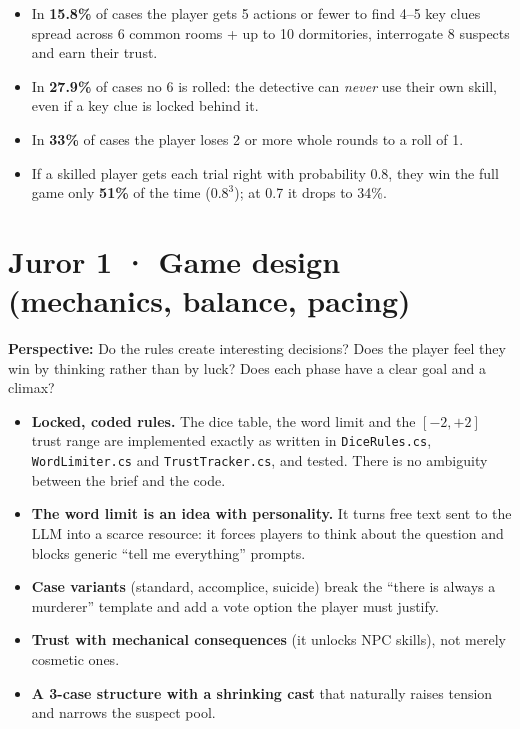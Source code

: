 \documentclass[11pt,a4paper]{article}
\newcommand{\file}[1]{\texttt{\small #1}}
\begin{document}
\begin{itemize}
\item In \textbf{15.8\%} of cases the player gets 5 actions or fewer to find 4--5 key clues spread
across 6 common rooms + up to 10 dormitories, interrogate 8 suspects and earn their trust.
\item In \textbf{27.9\%} of cases no 6 is rolled: the detective can \emph{never} use their own skill,
even if a key clue is locked behind it.
\item In \textbf{33\%} of cases the player loses 2 or more whole rounds to a roll of 1.
\item If a skilled player gets each trial right with probability 0.8, they win the full game only
\textbf{51\%} of the time ($0.8^3$); at 0.7 it drops to 34\%.
\end{itemize}

\section{Juror 1 · Game design (mechanics, balance, pacing)}

\begin{perfil}
\textbf{Perspective:} Do the rules create interesting decisions? Does the player feel they win by
thinking rather than by luck? Does each phase have a clear goal and a climax?
\end{perfil}

\begin{fuerte}
\begin{itemize}
\item \textbf{Locked, coded rules.} The dice table, the word limit and the $[-2,+2]$ trust range are
implemented exactly as written in \file{DiceRules.cs}, \file{WordLimiter.cs} and
\file{TrustTracker.cs}, and tested. There is no ambiguity between the brief and the code.
\item \textbf{The word limit is an idea with personality.} It turns free text sent to the LLM into a
scarce resource: it forces players to think about the question and blocks generic ``tell me
everything'' prompts.
\item \textbf{Case variants} (standard, accomplice, suicide) break the ``there is always a murderer''
template and add a vote option the player must justify.
\item \textbf{Trust with mechanical consequences} (it unlocks NPC skills), not merely cosmetic ones.
\item \textbf{A 3-case structure with a shrinking cast} that naturally raises tension and narrows the
suspect pool.
\end{itemize}
\end{fuerte}
\end{document}

